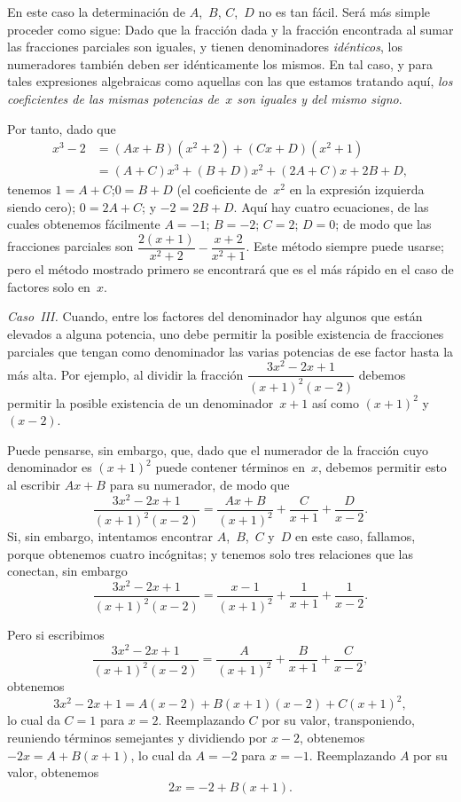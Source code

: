 \documentclass[12pt]{book}[2005/09/16]
\newcommand{\Paragraph}[1]{\medskip\pagebreak[1]\par\textit{#1}}
\newcommand{\DPPageSep}[2]{\Pagelabel{#2}}
\newcommand{\Pagelabel}[1]
  {\phantomsection\label{#1}}
\begin{document}
En este caso la determinación de $A$,~$B$, $C$,~$D$ no es
tan fácil. Será más simple proceder como sigue:
Dado que la fracción dada y la fracción encontrada al
sumar las fracciones parciales son iguales, y tienen
denominadores \emph{idénticos}, los numeradores también deben ser
idénticamente los mismos. En tal caso, y para tales
expresiones algebraicas como aquellas con las que estamos
tratando aquí, \emph{los coeficientes de las mismas potencias de~$x$
son iguales y del mismo signo}.

Por tanto, dado que
\begin{align*}
x^3-2
  &= (Ax+B)(x^2+2) + (Cx+D)(x^2+1) \\
  &= (A+C)x^3 + (B+D)x^2 + (2A+C)x + 2B+D,
\end{align*}
tenemos $1=A+C$;\quad $0=B+D$ (el coeficiente de~$x^2$
en la expresión izquierda siendo cero); $0=2A+C$; y
$-2=2B+D$. Aquí hay cuatro ecuaciones, de las cuales
obtenemos fácilmente $A=-1$; $B=-2$; $C=2$; $D=0$;
de modo que las fracciones parciales son $\dfrac{2(x+1)}{x^2+2} - \dfrac{x+2}{x^2+1}$.
\DPPageSep{139.png}{127}%
Este método siempre puede usarse; pero el método
mostrado primero se encontrará que es el más rápido en el caso de
factores solo en~$x$.

\Paragraph{Caso~III\@.} Cuando, entre los factores del denominador
hay algunos que están elevados a alguna potencia,
uno debe permitir la posible existencia de fracciones
parciales que tengan como denominador las varias potencias
de ese factor hasta la más alta. Por ejemplo, al
dividir la fracción $\dfrac{3x^2-2x+1}{(x+1)^2(x-2)}$ debemos permitir la
posible existencia de un denominador~$x+1$ así como
$(x+1)^2$ y~$(x-2)$.

Puede pensarse, sin embargo, que, dado que el numerador
de la fracción cuyo denominador es $(x+1)^2$
puede contener términos en~$x$, debemos permitir esto al
escribir $Ax+B$ para su numerador, de modo que
\[
\frac{3x^2 - 2x + 1}{(x+1)^2(x-2)}
  = \frac{Ax+B}{(x+1)^2} + \frac{C}{x+1} + \frac{D}{x-2}.
\]
Si, sin embargo, intentamos encontrar $A$,~$B$,~$C$ y~$D$ en este caso,
fallamos, porque obtenemos cuatro incógnitas; y tenemos
solo tres relaciones que las conectan, sin embargo
\[
\frac{3x^2 - 2x + 1}{(x+1)^2(x-2)}
  = \frac{x-1}{(x+1)^2} + \frac{1}{x+1} + \frac{1}{x-2}.
\]

Pero si escribimos
\[
\frac{3x^2 - 2x + 1}{(x+1)^2(x-2)}
  = \frac{A}{(x+1)^2} + \frac{B}{x+1} + \frac{C}{x-2},
\]
obtenemos
\[
3x^2 - 2x+1 = A(x-2) + B(x+1)(x-2) + C(x+1)^2,
\]
\DPPageSep{140.png}{128}%
lo cual da $C=1$ para $x=2$. Reemplazando $C$ por su valor,
transponiendo, reuniendo términos semejantes y dividiendo por
$x-2$, obtenemos $-2x= A+B(x+1)$, lo cual da $A=-2$
para $x=-1$. Reemplazando $A$ por su valor, obtenemos
\[
2x = -2+B(x+1).
\]
\end{document}
